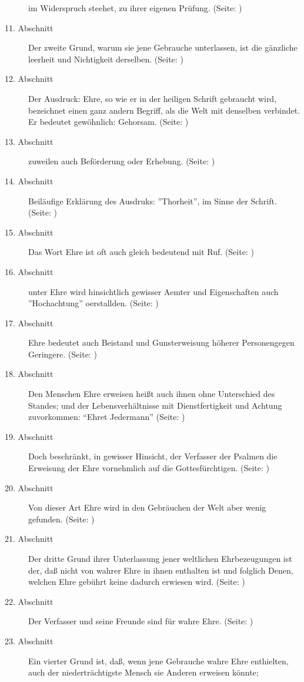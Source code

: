\begin{description}
im Widerspruch steehet, zu ihrer eigenen Prüfung. (Seite: \pageref{kap9_ab10})
\item[11. Abschnitt] Der zweite Grund, warum sie jene Gebrauche unterlassen, ist
die gänzliche leerheit und Nichtigkeit derselben. (Seite: \pageref{kap9_ab11})
\item[12. Abschnitt] Der Ausdruck: Ehre, so wie er in der heiligen Schrift
gebraucht wird, bezeichnet einen ganz andern Begriff, als die Welt mit denselben
verbindet. Er bedeutet gewöhnlich: Gehorsam. (Seite: \pageref{kap9_ab12})
\item[13. Abschnitt] zuweilen auch Beförderung oder Erhebung. (Seite: \pageref{kap9_ab13})
\item[14. Abschnitt] Beiläufige Erklärung des Ausdruks: ''Thorheit'', im Sinne
der Schrift. (Seite: \pageref{kap9_ab14})
\item[15. Abschnitt] Das Wort Ehre ist oft auch gleich bedeutend mit Ruf. (Seite: \pageref{kap9_ab15})
\item[16. Abschnitt] unter Ehre wird hinsichtlich gewisser Aemter und
Eigenschaften auch ''Hochachtung'' oerstallden. (Seite: \pageref{kap9_ab16})
\item[17. Abschnitt] Ehre bedeutet auch Beistand und Gunsterweisung höherer
Personengegen Geringere. (Seite: \pageref{kap9_ab17})
\item[18. Abschnitt]  Den Menschen Ehre erweisen heißt auch ihnen ohne
Unterschied des Standes; und der Lebensverhältnisse mit Dienstfertigkeit und
Achtung zuvorkommen: "`Ehret Jedermann"' (Seite: \pageref{kap9_ab18})
\item[19. Abschnitt] Doch beschränkt, in gewisser Hinsicht, der Verfasser der
Psalmen die Erweisung der Ehre vornehmlich auf die Gottesfürchtigen. (Seite: \pageref{kap9_ab19})
\item[20. Abschnitt] Von dieser Art Ehre wird in den Gebräuchen der Welt aber
wenig gefunden. (Seite: \pageref{kap9_ab20})
\item[21. Abschnitt] Der dritte Grund ihrer Unterlassung jener weltlichen
Ehrbezeugungen ist der, daß nicht von wahrer Ehre in ihnen enthalten ist und
folglich Denen, welchen Ehre gebührt keine dadurch erwiesen wird. (Seite: \pageref{kap9_ab21})
\item[22. Abschnitt] Der Verfasser und seine Freunde sind für wahre Ehre. (Seite: \pageref{kap9_ab22})
\item[23. Abschnitt] Ein vierter Grund ist, daß, wenn jene Gebrauche wahre Ehre
enthielten, auch der niederträchtigste Mensch sie Anderen erweisen könnte;

\end{description}
